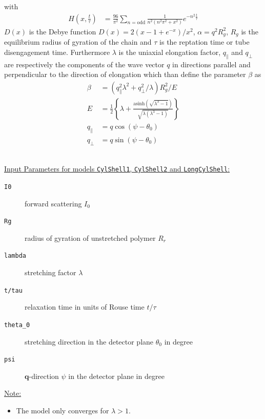 with
\begin{align}
H\left(x,\frac{t}{\tau}\right) &= \frac{96}{\pi^2} \sum_{n = \mathrm{odd}} \frac{1}{n^2\left(n^2\pi^2+x^2\right)} e^{-n^2 \frac{t}{\tau}}
\end{align}
$D(x)$ is the Debye function $D(x) = 2\left(x - 1 + e^{-x}\right)/x^2$, $\alpha = q^2 R_g^2$, $R_g$ is the equilibrium radius of gyration
of the chain and $\tau$ is the reptation time or tube disengagement time.
Furthermore $\lambda$ is the uniaxial elongation factor, $q_\parallel$ and $q_\perp$ are respectively the components of the wave vector $q$ in directions parallel and
perpendicular to the direction of elongation which than define the parameter $\beta$ as
\begin{align}
\beta &= \left(q_\parallel^2\lambda^2+q_\perp^2/\lambda\right) R_g^2/E \\
E &= \frac{1}{2} \left\{\lambda +\frac{\mathrm{asinh}\left(\sqrt{\lambda^3-1}\right)}{\sqrt{\lambda\left(\lambda^3-1\right)}} \right\} \\
q_\parallel &= q \cos(\psi-\theta_0) \\
q_\perp &= q \sin(\psi-\theta_0)
\end{align}

\hspace{1pt}\\
\underline{Input Parameters for models \texttt{CylShell1}, \texttt{CylShell2} and \texttt{LongCylShell}:}\\
\begin{description}
\item[\texttt{I0}] forward scattering $I_0$
\item[\texttt{Rg}] radius of gyration of unstretched polymer $R_r$
\item[\texttt{lambda}] stretching factor $\lambda$
\item[\texttt{t/tau}] relaxation time in units of Rouse time $t/\tau$
\item[\texttt{theta\_0}] stretching direction in the detector plane $\theta_0$ in degree
\item[\texttt{psi}] $\mathbf{q}$-direction $\psi$ in the detector plane in degree
\end{description}

\underline{Note:}
\begin{itemize}
\item The model only converges for $\lambda >1$.
\end{itemize}

